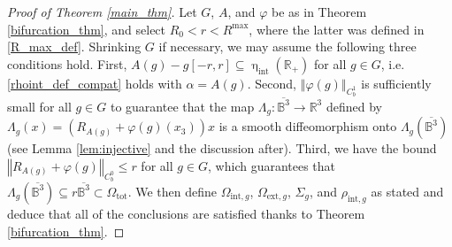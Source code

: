\documentclass[11pt,reqno]{amsart}
\numberwithin{equation}{section}
\providecommand{\norm}[1]{\left\Vert#1\right\Vert}
\providecommand{\norm}[1]{\left\Vert#1\right\Vert}
\newcommand{\m}{\mathrm}
\def\hint{\upeta_{\m{int}}}
\def\R{\mathbb{R}}
\begin{document}
\begin{proof}[Proof of Theorem \ref{main_thm}]
Let $G$, $A$, and $\varphi$ be as in Theorem \ref{bifurcation_thm}, and select $R_0 < r < R^{\m{max}}$, where the latter was defined in \eqref{R_max_def}.   Shrinking $G$ if necessary, we may assume the following three conditions hold.  First, $A(g) -g [-r,r] \subseteq \hint(\R_+)$ for all $g \in G$, i.e. \eqref{rhoint_def_compat} holds with $\alpha = A(g)$.  Second, $\norm{\varphi(g)}_{C^1_b}$ is sufficiently small for all $g \in G$ to guarantee that the map  $\Lambda_g : \overline{\mathbb B^3} \to \R^3$ defined by $\Lambda_g(x) = (R_{A(g)} +  \varphi(g)(x_3)) x$  is a smooth diffeomorphism onto $\Lambda_g ( \overline{\mathbb B^3})$ (see Lemma \ref{lem:injective} and the discussion after).  Third,  we have the bound $\norm{ R_{A(g)} + \varphi(g) }_{C^0_b} \le r$ for all $g \in G$, which guarantees that $\Lambda_g(\overline{\mathbb{B}^3}) \subseteq r \overline{\mathbb{B}^3} \subset \Omega_{\m{tot}}$.  We then define $\Omega_{\m{int},g}$, $\Omega_{\m{ext},g}$, $\Sigma_g$, and $\rho_{\m{int},g}$ as stated and deduce that all of the conclusions are satisfied thanks to Theorem \ref{bifurcation_thm}.
\end{proof}
 
 
\end{document}
